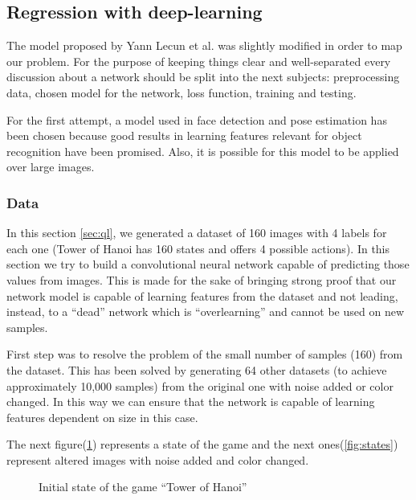 \subsection{Regression with deep-learning}
The model proposed by Yann Lecun et al.\cite{energy-based} was slightly modified in order to map our problem. For the purpose of keeping things clear and well-separated every discussion about a network should be split into the next subjects: preprocessing data, chosen model for the network, loss function, training and testing.

For the first attempt, a model used in face detection and pose estimation has been chosen because good results in learning features relevant for object recognition have been promised. Also, it is possible for this model to be applied over large images.

\subsubsection{Data}

In this section \ref{sec:ql}, we generated a dataset of 160 images with 4 labels for each one (Tower of Hanoi has 160 states and offers 4 possible actions). In this section we try to build a convolutional neural network capable of predicting those values from images. This is made for the sake of bringing strong proof that our network model is capable of learning features from the dataset and not leading, instead, to a ``dead'' network which is ``overlearning'' and cannot be used on new samples.

First step was to resolve the problem of the small number of samples (160) from the dataset. This has been solved by generating 64 other datasets (to achieve approximately 10,000 samples) from the original one with noise added or color changed. In this way we can ensure that the network is capable of learning features dependent on size in this case.

The next figure(\ref{fig:155}) represents a state of the game and the next ones(\ref{fig:states}) represent altered images with noise added and color changed.

\begin{figure}[h]
	\begin{center}
		\caption{Initial state of the game ``Tower of Hanoi''} \label{fig:155}
    \end{center}
\end{figure}

